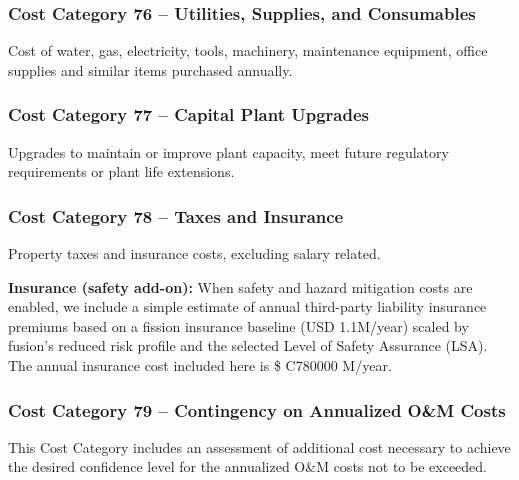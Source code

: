 \subsubsection*{Cost Category 76 – Utilities, Supplies, and Consumables}
Cost of water, gas, electricity, tools, machinery, maintenance equipment, office supplies and similar items purchased annually.

\subsubsection*{Cost Category 77 – Capital Plant Upgrades}
Upgrades to maintain or improve plant capacity, meet future regulatory requirements or plant life extensions.

\subsubsection*{Cost Category 78 – Taxes and Insurance}
Property taxes and insurance costs, excluding salary related.
\ifsafetycosts

\textbf{Insurance (safety add-on):} When safety and hazard mitigation costs are enabled, we include a simple estimate of annual third-party liability insurance premiums based on a fission insurance baseline (USD 1.1M/year) scaled by fusion's reduced risk profile and the selected Level of Safety Assurance (LSA). The annual insurance cost included here is \$ C780000 M/year.
\fi

\subsubsection*{Cost Category 79 – Contingency on Annualized O\&M Costs}
This Cost Category includes an assessment of additional cost necessary to achieve the desired confidence level for the annualized O\&M costs not to be exceeded.
